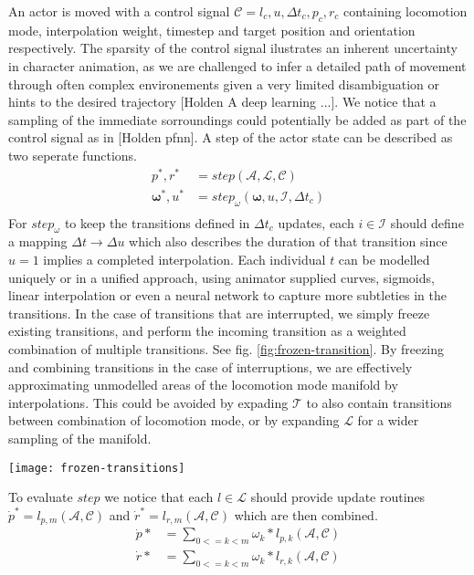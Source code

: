 An actor is moved with a control signal $\mathcal{C}=l_c, u, \Delta{t}_c, p_c,r_c$ containing locomotion mode, interpolation weight, timestep and target position and orientation respectively. The sparsity of the control signal ilustrates an inherent uncertainty in character animation, as we are challenged to infer a detailed path of movement through often complex environements given a very limited disambiguation or hints to the desired trajectory [Holden A deep learning ...]. We notice that a sampling of the immediate sorroundings could potentially be added as part of the control signal as in [Holden pfnn]. A step of the actor state can be described as two seperate functions.
\begin{equation}
\begin{split}
p^*,r^*&=step(\mathcal{A},\mathcal{L}, \mathcal{C})\\
\boldsymbol{\omega}^*,u^*&=step_{\omega}(\boldsymbol{\omega},u,\mathcal{I}, \Delta{t}_c)\\
\end{split}
\end{equation}
For $step_{\omega}$ to keep the transitions defined in $\Delta{t}_c$ updates, each $i\in\mathcal{I}$ should define a mapping $\Delta{t} \rightarrow{\Delta{u}}$ which also describes the duration of that transition since $u=1$ implies a completed interpolation. Each individual $t$ can be modelled uniquely or in a unified approach, using animator supplied curves, sigmoids, linear interpolation or even a neural network to capture more subtleties in the transitions. In the case of transitions that are interrupted, we simply freeze existing transitions, and perform the incoming transition as a weighted combination of multiple transitions. See fig. \ref{fig:frozen-transition}. By freezing and combining transitions in the case of interruptions, we are effectively approximating unmodelled areas of the locomotion mode manifold by interpolations. This could be avoided by expading $\mathcal{T}$ to also contain transitions between combination of locomotion mode, or by expanding $\mathcal{L}$ for a wider sampling of the manifold.  
\begin{figure*}
  \texttt{[image: frozen-transitions]}
  \caption{Frozen transition}
  \label{fig:frozen-transition}
\end{figure*}
To evaluate $step$ we notice that each $l\in\mathcal{L}$ should provide update routines $\dot{p}^*=l_{p,m}(\mathcal{A},\mathcal{C})$ and $\dot{r}^*=l_{r,m}(\mathcal{A},\mathcal{C})$ which are then combined.
\begin{equation}
\begin{split}
\dot{p}*&=\sum_{0<=k<m}\omega_k*l_{p,k}(\mathcal{A},\mathcal{C})\\
\dot{r}*&=\sum_{0<=k<m}\omega_k*l_{r,k}(\mathcal{A},\mathcal{C})\\
\end{split}
\end{equation}

